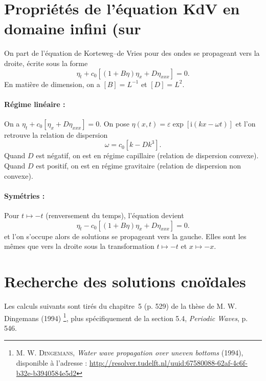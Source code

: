 \documentclass[10pt,a4paper, oneside, fleqn]{myarticle}
\newcommand{\id}{\mathrm{i}}
\newcommand{\Rset}{\mathbb{R}}
\begin{document}

\section{Propriétés de l'équation KdV en domaine infini (sur \boldmath{$\Rset$)}}

On part de l'équation de Korteweg--de Vries pour des ondes se propageant vers la droite, écrite sous la forme
\begin{equation}
  \eta_t + c_0\left[ (1 + B\eta) \eta_x + D\eta_{xxx}\right]=0. \label{KdV}
\end{equation}
En matière de dimension, on a $[B]=L^{-1}$ et $[D]=L^2$. 

\paragraph{Régime linéaire :} On a $\eta_t + c_0\left[  \eta_x + D\eta_{xxx}\right]=0$. On pose $\eta(x,t)=\varepsilon \exp[\id(k x - \omega t)]$ et l'on retrouve la relation de dispersion
\begin{equation}
  \omega = c_0\left[k - D k^3\right].
\end{equation}
Quand $D$ est négatif, on est en régime capillaire (relation de dispersion convexe). Quand $D$ est positif, on est en régime gravitaire (relation de dispersion non convexe).

\paragraph{Symétries :} Pour $t\mapsto -t$ (renversement du temps), l'équation devient 
\begin{equation}
  \eta_t - c_0\left[ (1 + B\eta) \eta_x + D\eta_{xxx}\right]=0.
\end{equation}
et l'on s'occupe alors de solutions se propageant vers la gauche. Elles sont les mêmes que vers la droite sous la transformation $t\mapsto -t$ et $x\mapsto -x$.

\section{Recherche des solutions cnoïdales}

\textsf{Les calculs suivants sont tirés du chapitre~5 (p. 529) de la thèse de {M. W. Dingemans} (1994)%
  \footnote{\textsc{M. W. Dingemans}, \emph{Water wave propagation over uneven bottoms} (1994), disponible à l'adresse : \url{http://resolver.tudelft.nl/uuid:67580088-62af-4c6f-b32e-b3940584e5d2}},  plus spécifiquement de la section 5.4, \emph{Periodic Waves}, p. 546.}
\end{document}
